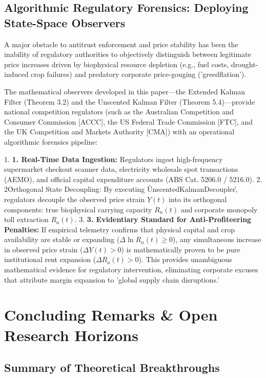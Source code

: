 \documentclass[preprint,12pt,authoryear]{elsarticle}
\theoremstyle{definition}
\begin{document}
\subsection{Algorithmic Regulatory Forensics: Deploying State-Space Observers}

A major obstacle to antitrust enforcement and price stability has been the inability of regulatory authorities to objectively distinguish between legitimate price increases driven by biophysical resource depletion (e.g., fuel costs, drought-induced crop failures) and predatory corporate price-gouging ('greedflation').

The mathematical observers developed in this paper---the Extended Kalman Filter (Theorem 3.2) and the Unscented Kalman Filter (Theorem 5.4)---provide national competition regulators (such as the Australian Competition and Consumer Commission [ACCC], the US Federal Trade Commission [FTC], and the UK Competition and Markets Authority [CMA]) with an operational algorithmic forensics pipeline:

1.  \textbf{1. Real-Time Data Ingestion:} Regulators ingest high-frequency supermarket checkout scanner data, electricity wholesale spot transactions (AEMO), and official capital expenditure accounts (ABS Cat. 5206.0 / 5216.0).
2.  2\. Orthogonal State Decoupling: By executing \`UnscentedKalmanDecoupler\`, regulators decouple the observed price strain $Y(t)$ into its orthogonal components: true biophysical carrying capacity $R_n(t)$ and corporate monopoly toll extraction $R_a(t)$.
3.  \textbf{3. Evidentiary Standard for Anti-Profiteering Penalties:} If empirical telemetry confirms that physical capital and crop availability are stable or expanding ($\Delta \ln R_n(t) \ge 0$), any simultaneous increase in observed price strain ($\Delta Y(t) > 0$) is mathematically proven to be pure institutional rent expansion ($\Delta R_a(t) > 0$). This provides unambiguous mathematical evidence for regulatory intervention, eliminating corporate excuses that attribute margin expansion to 'global supply chain disruptions.'

\section{Concluding Remarks \& Open Research Horizons}



\subsection{Summary of Theoretical Breakthroughs}
\end{document}
